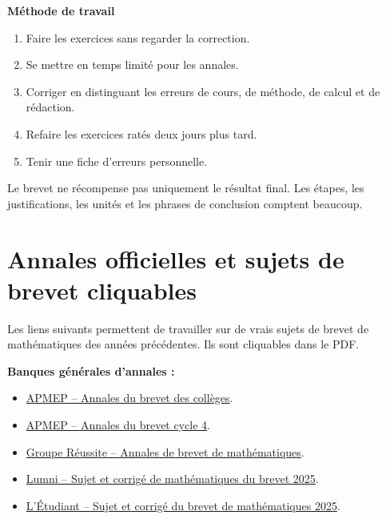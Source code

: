\documentclass[11pt,a4paper]{article}
\newcounter{exercice}
\newcounter{correction}
\begin{document}
\begin{methode}
\textbf{Méthode de travail}
\begin{enumerate}
  \item Faire les exercices sans regarder la correction.
  \item Se mettre en temps limité pour les annales.
  \item Corriger en distinguant les erreurs de cours, de méthode, de calcul et de rédaction.
  \item Refaire les exercices ratés deux jours plus tard.
  \item Tenir une fiche d'erreurs personnelle.
\end{enumerate}
\end{methode}

\begin{attention}
Le brevet ne récompense pas uniquement le résultat final. Les étapes, les justifications, les unités et les phrases de conclusion comptent beaucoup.
\end{attention}

\section{Annales officielles et sujets de brevet cliquables}

\begin{objectif}
Les liens suivants permettent de travailler sur de vrais sujets de brevet de mathématiques des années précédentes. Ils sont cliquables dans le PDF.
\end{objectif}

\begin{retenir}
\textbf{Banques générales d'annales :}
\begin{itemize}
  \item \href{https://www.apmep.fr/Annales-du-Brevet-des-colleges}{APMEP -- Annales du brevet des collèges}.
  \item \href{https://www.apmep.fr/Annales-du-Brevet-cycle-4}{APMEP -- Annales du brevet cycle 4}.
  \item \href{https://groupe-reussite.fr/ressources/annales-brevet-maths/}{Groupe Réussite -- Annales de brevet de mathématiques}.
  \item \href{https://www.lumni.fr/article/maths-sujets-et-corriges-serie-generale-brevet-2025}{Lumni -- Sujet et corrigé de mathématiques du brevet 2025}.
  \item \href{https://www.letudiant.fr/college/brevet/sujets-et-corriges-du-brevet-de-mathematiques-2025-dnb.html}{L'Étudiant -- Sujet et corrigé du brevet de mathématiques 2025}.
\end{itemize}
\end{retenir}
\end{document}
